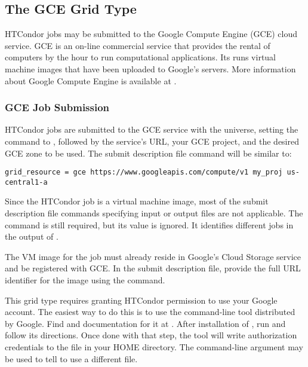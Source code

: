 \subsection{\label{sec:Gce}The GCE Grid Type }

HTCondor jobs may be submitted to the Google Compute Engine (GCE)
cloud service.
GCE is an on-line commercial service that provides
the rental of computers by the hour to run computational applications.
Its runs virtual machine images that have been uploaded to Google's
servers.
More information about Google Compute Engine is available at
.

\subsubsection{\label{sec:Gce-submit}GCE Job Submission}

HTCondor jobs are submitted to the GCE service
with the  universe, setting the
 command to , followed 
by the service's URL, your GCE project, 
and the desired GCE zone to be used.
The submit description file command will be similar to:
\begin{verbatim}
grid_resource = gce https://www.googleapis.com/compute/v1 my_proj us-central1-a
\end{verbatim}

Since the HTCondor job is a virtual machine image,
most of the submit description file commands
specifying input or output files are not applicable.
The  command is still required,
but its value is ignored. 
It identifies different jobs in the output of .

The VM image for the job must already reside in Google's Cloud Storage
service and be registered with GCE.
In the submit description file,
provide the full URL identifier for the image using 
the  command.

This grid type requires granting HTCondor permission to use your
Google account. 
The easiest way to do this is to use the 
command-line tool distributed by Google.
Find  and documentation for it at
.
After installation of , 
run  and follow its directions.
Once done with that step,
the tool will write authorization credentials to the
file  in your HOME directory.
The  command-line argument may be used to tell
 to use a different file.


